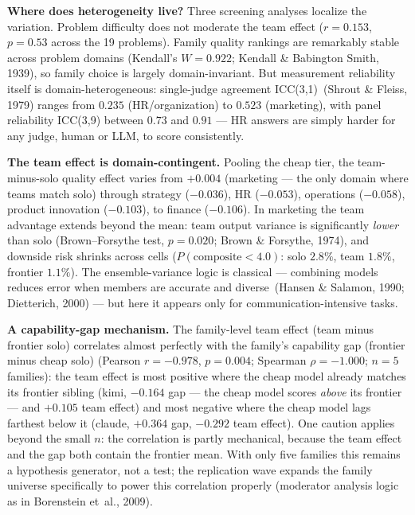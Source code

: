 \documentclass[12pt,a4paper]{article}
\begin{document}
\textbf{Where does heterogeneity live?} Three screening analyses localize the
variation. Problem difficulty does not moderate the team effect
($r = 0.153$, $p = 0.53$ across the 19 problems). Family quality rankings are
remarkably stable across problem domains (Kendall's $W = 0.922$;
Kendall \& Babington Smith, 1939), so family choice is largely
domain-invariant. But measurement reliability itself is domain-heterogeneous:
single-judge agreement ICC(3,1)~(Shrout \& Fleiss, 1979) ranges from $0.235$
(HR/organization) to $0.523$ (marketing), with panel reliability ICC(3,9)
between $0.73$ and $0.91$ --- HR answers are simply harder for any judge,
human or LLM, to score consistently.

\textbf{The team effect is domain-contingent.} Pooling the cheap tier, the
team-minus-solo quality effect varies from $+0.004$ (marketing --- the only
domain where teams match solo) through strategy ($-0.036$), HR ($-0.053$),
operations ($-0.058$), product innovation ($-0.103$), to finance
($-0.106$). In marketing the team advantage extends beyond the mean: team
output variance is significantly \emph{lower} than solo (Brown--Forsythe test,
$p = 0.020$; Brown \& Forsythe, 1974), and downside risk shrinks across cells
($P(\text{composite} < 4.0)$: solo $2.8\%$, team $1.8\%$, frontier $1.1\%$).
The ensemble-variance logic is classical --- combining models reduces error
when members are accurate and diverse~(Hansen \& Salamon, 1990; Dietterich,
2000) --- but here it appears only for communication-intensive tasks.

\textbf{A capability-gap mechanism.} The family-level team effect (team minus
frontier solo) correlates almost perfectly with the family's capability gap
(frontier minus cheap solo)
(Pearson $r = -0.978$, $p = 0.004$; Spearman $\rho = -1.000$; $n = 5$
families): the team effect is most positive where the cheap model already
matches its frontier sibling (kimi, $-0.164$ gap --- the cheap model scores
\emph{above} its frontier --- and $+0.105$ team effect) and most negative
where the cheap model lags farthest below it (claude, $+0.364$ gap,
$-0.292$ team effect). One caution applies beyond the small $n$: the
correlation is partly mechanical, because the team effect and the gap both
contain the frontier mean. With only five families
this remains a hypothesis generator, not a test; the replication wave expands
the family universe specifically to power this correlation properly
(moderator analysis logic as in Borenstein et~al., 2009).
\end{document}
